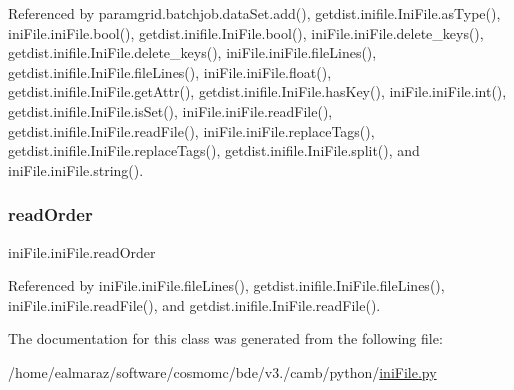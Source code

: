Referenced by paramgrid.\+batchjob.\+data\+Set.\+add(), getdist.\+inifile.\+Ini\+File.\+as\+Type(), ini\+File.\+ini\+File.\+bool(), getdist.\+inifile.\+Ini\+File.\+bool(), ini\+File.\+ini\+File.\+delete\+\_\+keys(), getdist.\+inifile.\+Ini\+File.\+delete\+\_\+keys(), ini\+File.\+ini\+File.\+file\+Lines(), getdist.\+inifile.\+Ini\+File.\+file\+Lines(), ini\+File.\+ini\+File.\+float(), getdist.\+inifile.\+Ini\+File.\+get\+Attr(), getdist.\+inifile.\+Ini\+File.\+has\+Key(), ini\+File.\+ini\+File.\+int(), getdist.\+inifile.\+Ini\+File.\+is\+Set(), ini\+File.\+ini\+File.\+read\+File(), getdist.\+inifile.\+Ini\+File.\+read\+File(), ini\+File.\+ini\+File.\+replace\+Tags(), getdist.\+inifile.\+Ini\+File.\+replace\+Tags(), getdist.\+inifile.\+Ini\+File.\+split(), and ini\+File.\+ini\+File.\+string().

\mbox{\label{classiniFile_1_1iniFile_ad6b8af421837b8b683d1634f3c156a84}} 
\subsubsection{\texorpdfstring{read\+Order}{readOrder}}
{\footnotesize\ttfamily ini\+File.\+ini\+File.\+read\+Order}



Referenced by ini\+File.\+ini\+File.\+file\+Lines(), getdist.\+inifile.\+Ini\+File.\+file\+Lines(), ini\+File.\+ini\+File.\+read\+File(), and getdist.\+inifile.\+Ini\+File.\+read\+File().



The documentation for this class was generated from the following file\+:\begin{DoxyCompactItemize}
\item 
/home/ealmaraz/software/cosmomc/bde/v3./camb/python/\mbox{\hyperlink{iniFile_8py}{ini\+File.\+py}}\end{DoxyCompactItemize}
